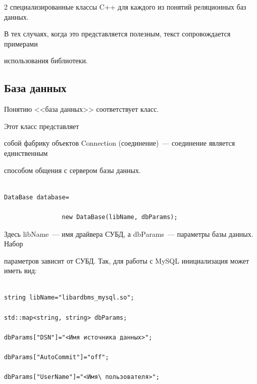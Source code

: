 \begin{multicols}{2}
специализированные классы C++ для каждого из понятий реляционных баз данных.



В тех случаях, когда это представляется полезным, текст сопровождается примерами 

использования библиотеки.



\vspace*{-6pt}



\subsection{База данных} %



\vspace*{-1pt}



Понятию <<база данных>> соответствует класс. 

Этот класс представляет 

собой фабрику объектов Connection (соединение)~--- соединение является единственным 

способом общения с сервером базы данных. 

{\small

\begin{verbatim}

DataBase database=

                new DataBase(libName, dbParams);

\end{verbatim}}



\noindent

Здесь {\sf libName}~--- имя драйвера СУБД, а {\sf dbParams}~--- параметры базы данных. Набор 

параметров зависит от СУБД. Так, для работы с MySQL инициализация может иметь вид:

{\small

\begin{verbatim}

string libName="libardbms_mysql.so";

std::map<string, string> dbParams;

dbParams["DSN"]="<Имя источника данных>";

dbParams["AutoCommit"]="off";

dbParams["UserName"]="<Имя\ пользователя>";


\end{verbatim}}
\end{multicols}
